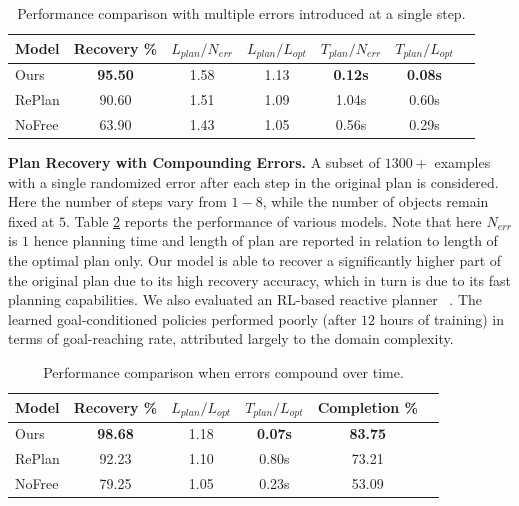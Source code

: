 \begin{table}[ht]
    \centering
    \caption{Performance comparison with multiple errors introduced at a single step.}
    \begin{tabular}{|l|c|c|c|c|c|c|}
    \hline
         Model & Recovery \% &  $L_{plan}/N_{err}$ & $L_{plan}/L_{opt}$ & $T_{plan}/N_{err}$ & $T_{plan}/L_{opt}$  \\ 
         \hline
         \hline
         Ours & \textbf{95.50} & 1.58 & 1.13 & \textbf{0.12s} & \textbf{0.08s} \\ 
         \hline 
         RePlan & 90.60 & 1.51 & 1.09 & 1.04s & 0.60s \\
        \hline 
         NoFree & 63.90 & 1.43 & 1.05 & 0.56s & 0.29s \\ 
         \hline
    \end{tabular}
    \label{tab:dset1}
\end{table}

%
\textbf{Plan Recovery with Compounding Errors. }
%
A subset of $1300+$ examples with a single randomized error after each step in the original plan is considered. Here the number of steps vary from $1-8$, while the number of objects remain fixed at $5$. Table \ref{tab:dset2} reports the performance of various models. Note that here $N_{err}$ is $1$ hence planning time and length of plan are reported in relation to length of the optimal plan only. Our model is able to recover a significantly higher part of the original plan due to its high recovery accuracy, which in turn is due to its fast planning capabilities.
%
We also evaluated an RL-based reactive planner ~\citep{li2020towards}. The learned goal-conditioned policies performed poorly (after $12$ hours of training) in terms of goal-reaching rate, attributed largely to the domain complexity. 

\begin{table}[ht]
    \centering
    \caption{Performance comparison when errors compound over time. }
    \begin{tabular}{|l|c|c|c|c|c|}
    \hline
         Model & Recovery \% & $L_{plan}/L_{opt}$ & $T_{plan}/L_{opt}$ & Completion \% \\ 
         \hline
         \hline
         Ours & \textbf{98.68} & 1.18 & \textbf{0.07s} & \textbf{83.75} \\ 
         \hline 
         RePlan & 92.23 & 1.10 & 0.80s & 73.21 \\
        \hline 
         NoFree & 79.25 & 1.05 & 0.23s & 53.09 \\ 
         \hline
    \end{tabular}
    \label{tab:dset2}
\end{table}


